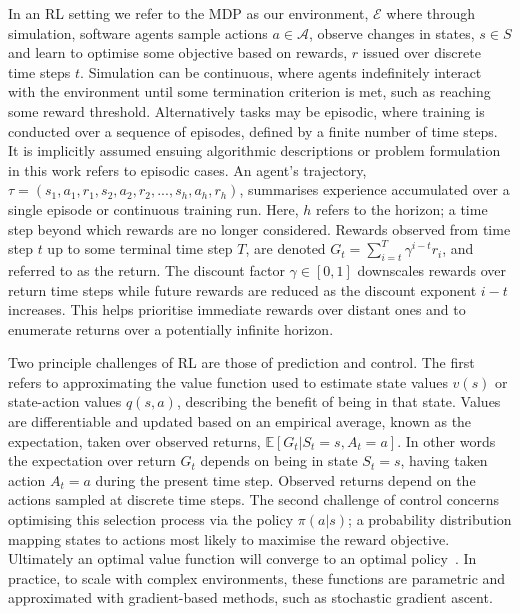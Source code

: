 \documentclass[runningheads]{llncs}
\begin{document}
In an RL setting we refer to the MDP as our environment, $\mathcal{E}$ where through simulation, software agents sample actions $a \in \mathcal{A}$, observe changes in states, $s \in S$ and learn to optimise some objective based on rewards, $r$ issued over discrete time steps $t$. Simulation can be continuous, where agents indefinitely interact with the environment until some termination criterion is met, such as reaching some reward threshold. Alternatively tasks may be episodic, where training is conducted over a sequence of episodes, defined by a finite number of time steps. It is implicitly assumed ensuing algorithmic descriptions or problem formulation in this work refers to episodic cases. An agent's trajectory, $\tau = (s_1, a_1, r_1,  s_2, a_2, r_2,...,s_h, a_h, r_h)$, summarises experience accumulated over a single episode or continuous training run. Here, $h$ refers to the horizon; a time step beyond which rewards are no longer considered. Rewards observed from time step $t$ up to some terminal time step $T$, are denoted $G_{t} = \sum_{i=t}^{T}\gamma^{i-t}r_{i}$, and referred to as the return. The discount factor $\gamma \in [0,1]$ downscales rewards over return time steps while future rewards are reduced as the discount exponent $i-t$ increases. This helps prioritise immediate rewards over distant ones and to enumerate returns over a potentially infinite horizon. 

Two principle challenges of RL are those of prediction and control. The first refers to approximating the value function used to estimate state values $v(s)$ or state-action values $q(s,a)$, describing the benefit of being in that state. Values are differentiable and updated based on an empirical average, known as the expectation, taken over observed returns, $\mathbb{E}[G_t | S_t = s, A_t = a]$. In other words the expectation over return $G_t$ depends on being in state $S_t = s$, having taken action $A_t = a$ during the present time step. Observed returns depend on the actions sampled at discrete time steps. The second challenge of control concerns optimising this selection process via the policy $\pi(a|s)$; a probability distribution mapping states to actions most likely to maximise the reward objective. Ultimately an optimal value function will converge to an optimal policy~\cite{melo2008analysis}. In practice, to scale with complex environments, these functions are parametric and approximated with gradient-based methods, such as stochastic gradient ascent.
\end{document}
